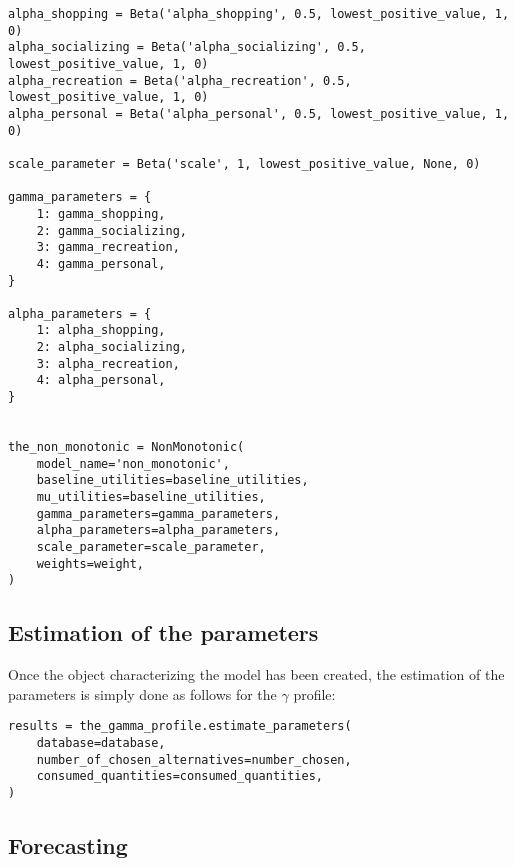 \documentclass[12pt,a4paper]{article}
\begin{document}
\begin{description}
\begin{center}
\begin{lstlisting}
alpha_shopping = Beta('alpha_shopping', 0.5, lowest_positive_value, 1, 0)
alpha_socializing = Beta('alpha_socializing', 0.5, lowest_positive_value, 1, 0)
alpha_recreation = Beta('alpha_recreation', 0.5, lowest_positive_value, 1, 0)
alpha_personal = Beta('alpha_personal', 0.5, lowest_positive_value, 1, 0)

scale_parameter = Beta('scale', 1, lowest_positive_value, None, 0)

gamma_parameters = {
    1: gamma_shopping,
    2: gamma_socializing,
    3: gamma_recreation,
    4: gamma_personal,
}

alpha_parameters = {
    1: alpha_shopping,
    2: alpha_socializing,
    3: alpha_recreation,
    4: alpha_personal,
}


the_non_monotonic = NonMonotonic(
    model_name='non_monotonic',
    baseline_utilities=baseline_utilities,
    mu_utilities=baseline_utilities,
    gamma_parameters=gamma_parameters,
    alpha_parameters=alpha_parameters,
    scale_parameter=scale_parameter,
    weights=weight,
)
         \end{lstlisting}
     \end{center}
\end{description}

\subsection{Estimation of the parameters}

Once the object characterizing the model has been created, the estimation of the parameters is simply done as follows for the $\gamma$ profile:
\begin{center}
         \begin{lstlisting}
results = the_gamma_profile.estimate_parameters(
    database=database,
    number_of_chosen_alternatives=number_chosen,
    consumed_quantities=consumed_quantities,
)
          \end{lstlisting}
     \end{center}

\subsection{Forecasting}
\end{document}
